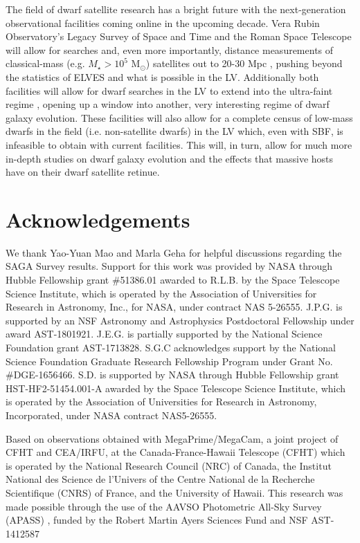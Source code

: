 \documentclass[twocolumn]{aastex62}
\newcommand{\msun}{M$_\odot$}
\begin{document}
The field of dwarf satellite research has a bright future with the next-generation observational facilities coming online in the upcoming decade. Vera Rubin Observatory's Legacy Survey of Space and Time and the Roman Space Telescope will allow for searches and, even more importantly, distance measurements of classical-mass (e.g. $M_\star>10^5$ \msun) satellites out to 20-30 Mpc \citep{greco2020}, pushing beyond the statistics of ELVES and what is possible in the LV. Additionally both facilities will allow for dwarf searches in the LV to extend into the ultra-faint regime \citep{mutlu2021b}, opening up a window into another, very interesting regime of dwarf galaxy evolution. These facilities will also allow for a complete census of low-mass dwarfs in the field (i.e. non-satellite dwarfs) in the LV which, even with SBF, is infeasible to obtain with current facilities. This will, in turn, allow for much more in-depth studies on dwarf galaxy evolution and the effects that massive hosts have on their dwarf satellite retinue.






\section*{Acknowledgements}
We thank Yao-Yuan Mao and Marla Geha for helpful discussions regarding the SAGA Survey results. Support for this work was provided by NASA through Hubble Fellowship grant \#51386.01 awarded to R.L.B. by the Space Telescope Science Institute, which is operated by the Association of  Universities for Research in Astronomy, Inc., for NASA, under contract NAS 5-26555. J.P.G. is supported by an NSF Astronomy and Astrophysics Postdoctoral Fellowship under award AST-1801921. J.E.G. is partially supported by the National Science Foundation grant AST-1713828. S.G.C acknowledges support by the National Science Foundation Graduate Research Fellowship Program under Grant No. \#DGE-1656466. S.D. is supported by NASA through Hubble Fellowship grant HST-HF2-51454.001-A awarded by the Space Telescope Science Institute, which is operated by the Association of Universities for Research in Astronomy, Incorporated, under NASA contract NAS5-26555.



Based on observations obtained with MegaPrime/MegaCam, a joint project of CFHT and CEA/IRFU, at the Canada-France-Hawaii Telescope (CFHT) which is operated by the National Research Council (NRC) of Canada, the Institut National des Science de l'Univers of the Centre National de la Recherche Scientifique (CNRS) of France, and the University of Hawaii. This research was made possible through the use of the AAVSO Photometric All-Sky Survey (APASS) \citep{apass}, funded by the Robert Martin Ayers Sciences Fund and NSF AST-1412587
\end{document}
